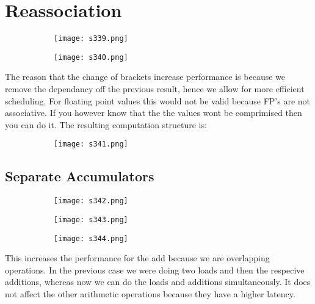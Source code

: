 \documentclass[8pt]{extreport}
\begin{document}
\section{Reassociation}
\begin{figure}[H]
\begin{subfigure}[b]{0.4\linewidth}
\texttt{[image: s339.png]}
\end{subfigure}
\begin{subfigure}[b]{0.4\linewidth}
\texttt{[image: s340.png]}
\end{subfigure}
\end{figure}
The reason that the change of brackets increase performance is because we remove the dependancy off the previous result, hence we allow for more efficient scheduling. For floating point values this would not be valid because FP's are not associative. If you however know that the the values wont be comprimised then you can do it. The resulting computation structure is:
\begin{figure}[H]
\begin{subfigure}[b]{0.4\linewidth}
\texttt{[image: s341.png]}
\end{subfigure}
\end{figure}

\subsection{Separate Accumulators}
\begin{figure}[H]
\begin{subfigure}[b]{0.4\linewidth}
\texttt{[image: s342.png]}
\end{subfigure}
\begin{subfigure}[b]{0.4\linewidth}
\texttt{[image: s343.png]}
\end{subfigure}
\begin{subfigure}[b]{0.4\linewidth}
\texttt{[image: s344.png]}
\end{subfigure}
\end{figure}
This increases the performance for the add because we are overlapping operations. In the previous case we were doing two loads and then the respecive additions, whereas now we can do the loads and additions simultaneously. It does not affect the other arithmetic operations because they have a higher latency.
\end{document}
